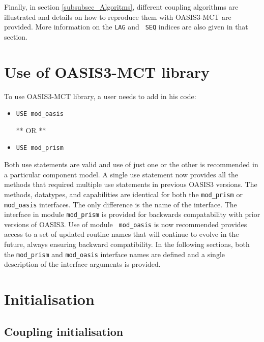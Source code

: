 Finally, in section \ref{subsubsec_Algoritms}, different coupling
algorithms are illustrated and details on how to reproduce them with
OASIS3-MCT are provided. More information on the {\tt LAG} and {\tt
  SEQ} indices are also given in that section.

\section{Use of OASIS3-MCT library}
\label{subsubsec_Use}

To use OASIS3-MCT library, a user needs to add in his code:

\begin{itemize}

\item {\tt USE mod\_oasis}

  ** OR **

\item {\tt USE mod\_prism}
 
\end{itemize}

Both use statements are valid and use of just one or the other is
recommended in a particular component model. A single use statement
now provides all the methods that required multiple use statements in
previous OASIS3 versions.  The methods, datatypes, and capabilities
are identical for both the {\tt mod\_prism} or {\tt mod\_oasis}
interfaces.  The only difference is the name of the interface. The
interface in module {\tt mod\_prism} is provided for backwards
compatability with prior versions of OASIS3. Use of module {\tt
  mod\_oasis} is now recommended provides access to a set of updated
routine names that will continue to evolve in the future, always
ensuring backward compatibility.  In the following sections, both the
{\tt mod\_prism} and {\tt mod\_oasis} interface names are defined and
a single description of the interface arguments is provided.

\section{Initialisation}
\label{subsubsec_Initialisation}

\subsection{Coupling initialisation}


